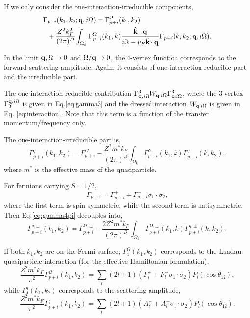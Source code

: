 \documentclass[reprint,amsmath,amssymb,aps,prb]{revtex4-1}
\begin{document}
If we only consider the one-interaction-irreducible components,
\begin{align}
    \Gamma & _{p+i}(k_1, k_2; \mathbf{q}, i\Omega)=\Gamma_{p+i}^\Omega(k_1, k_2) \nonumber                                                                                             \\
           & +\frac{Z^2k_F^2}{(2\pi)^D} \int_{\Omega_k} \Gamma_{p+i}^\Omega(k_1, k)\frac{\hat{\mathbf{k}}\cdot \mathbf{q}}{i\Omega-v_F \hat{\mathbf{k}}\cdot \mathbf{q}}\Gamma_{p+i}(k, k_2; \mathbf{q}, i\Omega).
\end{align}

In the limit $\mathbf{q}, \Omega\rightarrow 0$ and $\Omega/\mathbf{q} \rightarrow 0$, the $4$-vertex function corresponds to the forward scattering amplitude. Again, it consists of one-interaction-reducible part and the irreducible part.

The one-interaction-reducible contribution $\Gamma^3_{\mathbf{q}, i\Omega} W_{\mathbf{q}, i\Omega} \Gamma^3_{\mathbf{q}, i\Omega}$, where the $3$-vertex $\Gamma_3^{\mathbf{q}, i\Omega}$ is given in Eq.\eqref{eq:gamma3} and the dressed interaction $W_{\mathbf{q}, i\Omega}$ is given in Eq. \ref{eq:interaction}. Note that this term is a function of the transfer momentum/frequency only.

The one-interaction-irreducible part is,
\begin{equation}
    \label{eq:gamma4pi}
    \Gamma_{p+i}^q(k_1, k_2)=\Gamma_{p+i}^\Omega-\frac{Z^2m^* k_F}{(2\pi)^D} \int_{\Omega_k} \Gamma_{p+i}^\Omega(k_1, k)\Gamma_{p+i}^q(k, k_2),
\end{equation}
where $m^*$ is the effective mass of the quasiparticle.

For fermions carrying $S=1/2$,
\begin{equation}
    \Gamma_{p+i}=\Gamma_{p+i}^{+}+\Gamma_{p+i}^{-}\sigma_1\cdot\sigma_2,
\end{equation}
where the first term is spin symmetric, while the second term is antisymmetric. Then Eq.\eqref{eq:gamma4pi} decouples into,
\begin{equation}
    \label{eq:gamma4pi_spin}
    \Gamma_{p+i}^{q,\pm}(k_1, k_2)=\Gamma_{p+i}^{\Omega,\pm}-\frac{2 Z^2m^* k_F}{(2\pi)^D} \int_{\Omega_k} \Gamma_{p+i}^{\Omega,\pm}(k_1, k)\Gamma_{p+i}^{q,\pm}(k, k_2),
\end{equation}

If both $k_1, k_2$ are on the Fermi surface, $\Gamma_4^\Omega (k_1, k_2)$ corresponds to the Landau quasiparticle interaction (for the effective Hamiltonian formulation),
\begin{equation}
    \label{eq:F}
    \frac{Z^2 m^* k_F}{\pi^2}\Gamma_{p+i}^\Omega (k_1, k_2)=\sum_l (2l+1)(F_l^++F_l^-\sigma_1\cdot\sigma_2) P_l(\cos\theta_{12}),
\end{equation}
while $\Gamma_4^q (k_1, k_2)$ corresponds to the scattering amplitude,
\begin{equation}
    \frac{Z^2 m^* k_F}{\pi^2}\Gamma_{p+i}^q (k_1, k_2)=\sum_l (2l+1)(A_l^++A_l^-\sigma_1\cdot\sigma_2) P_l(\cos\theta_{12}).
\end{equation}
\end{document}
